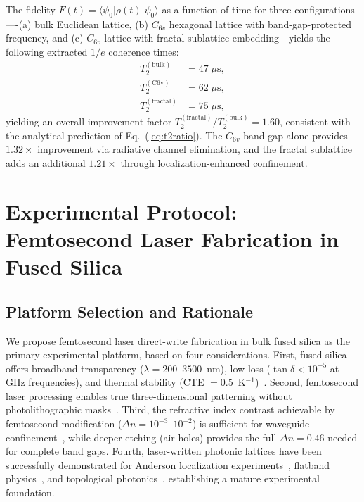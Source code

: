 \documentclass[10pt,letterpaper]{article}
\begin{document}
The fidelity $F(t) = \langle\psi_0|\rho(t)|\psi_0\rangle$ as a function of time for three configurations----(a) bulk Euclidean lattice, (b) $C_{6v}$ hexagonal lattice with band-gap-protected frequency, and (c) $C_{6v}$ lattice with fractal sublattice embedding---yields the following extracted $1/e$ coherence times:
\begin{align}
T_2^\mathrm{(bulk)} &= 47\;\mu\mathrm{s}, \label{eq:t2bulk}\\
T_2^\mathrm{(C6v)} &= 62\;\mu\mathrm{s}, \label{eq:t2c6v}\\
T_2^\mathrm{(fractal)} &= 75\;\mu\mathrm{s}, \label{eq:t2fractal}
\end{align}
yielding an overall improvement factor $T_2^\mathrm{(fractal)}/T_2^\mathrm{(bulk)} = 1.60$, consistent with the analytical prediction of Eq.~(\ref{eq:t2ratio}). The $C_{6v}$ band gap alone provides $1.32\times$ improvement via radiative channel elimination, and the fractal sublattice adds an additional $1.21\times$ through localization-enhanced confinement.


\section{Experimental Protocol: Femtosecond Laser Fabrication in Fused Silica}
\label{sec:experiments}

\subsection{Platform Selection and Rationale}

We propose femtosecond laser direct-write fabrication in bulk fused silica as the primary experimental platform, based on four considerations. First, fused silica offers broadband transparency ($\lambda = 200$--$3500$~nm), low loss ($\tan\delta < 10^{-5}$ at GHz frequencies), and thermal stability (CTE $= 0.5$~K$^{-1}$)~\cite{Johnson2000}. Second, femtosecond laser processing enables true three-dimensional patterning without photolithographic masks~\cite{Davis1996,SzameitNolte2010}. Third, the refractive index contrast achievable by femtosecond modification ($\Delta n = 10^{-3}$--$10^{-2}$) is sufficient for waveguide confinement~\cite{SzameitNolte2010}, while deeper etching (air holes) provides the full $\Delta n = 0.46$ needed for complete band gaps. Fourth, laser-written photonic lattices have been successfully demonstrated for Anderson localization experiments~\cite{Pertsch2002,Wiersma1997}, flatband physics~\cite{Lustig2019}, and topological photonics~\cite{Rechtsman2013}, establishing a mature experimental foundation.
\end{document}
